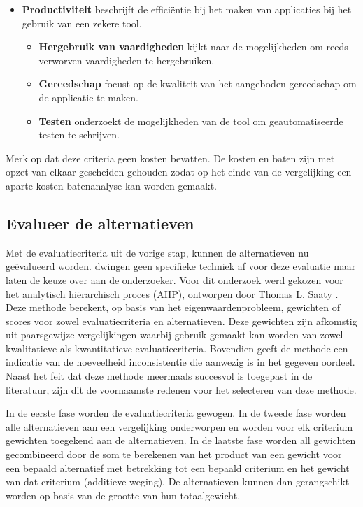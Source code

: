 \documentclass[a4paper]{IEEEconf}
\begin{document}
\begin{itemize}
    \item \textbf{Productiviteit} beschrijft de effici\"entie bij het maken van applicaties bij het gebruik van een zekere tool. 
    \begin{itemize}
        \item \textbf{Hergebruik van vaardigheden} kijkt naar de mogelijkheden om reeds verworven vaardigheden te hergebruiken.
        \item \textbf{Gereedschap} focust op de kwaliteit van het aangeboden gereedschap om de applicatie te maken.
        \item \textbf{Testen} onderzoekt de mogelijkheden van de tool om geautomatiseerde testen te schrijven. 
    \end{itemize}
\end{itemize}

Merk op dat deze criteria geen kosten bevatten. De kosten en baten zijn met opzet van elkaar gescheiden gehouden zodat op het einde van de vergelijking een aparte kosten-batenanalyse kan worden gemaakt.

\subsection{Evalueer de alternatieven}

Met de evaluatiecriteria uit de vorige stap, kunnen de alternatieven nu ge\"evalueerd worden. \citet{Jadhav:2011} dwingen geen specifieke techniek af voor deze evaluatie maar laten de keuze over aan de onderzoeker. Voor dit onderzoek werd gekozen voor het analytisch hi\"erarchisch proces (AHP), ontworpen door Thomas L. Saaty \cite{Saaty:1980, Saaty:1990}. Deze methode berekent, op basis van het eigenwaardenprobleem, gewichten of scores voor zowel evaluatiecriteria en alternatieven. Deze gewichten zijn afkomstig uit paarsgewijze vergelijkingen waarbij gebruik gemaakt kan worden van zowel kwalitatieve als kwantitatieve evaluatiecriteria. Bovendien geeft de methode een indicatie van de hoeveelheid inconsistentie die aanwezig is in het gegeven oordeel. Naast het feit dat deze methode meermaals succesvol is toegepast in de literatuur, zijn dit de voornaamste redenen voor het selecteren van deze methode. 

In de eerste fase worden de evaluatiecriteria gewogen. In de tweede fase worden alle alternatieven aan een vergelijking onderworpen en worden voor elk criterium gewichten toegekend aan de alternatieven. In de laatste fase worden all gewichten gecombineerd door de som te berekenen van het product van een gewicht voor een bepaald alternatief met betrekking tot een bepaald criterium en het gewicht van dat criterium (additieve weging). De alternatieven kunnen dan gerangschikt worden op basis van de grootte van hun totaalgewicht.
\end{document}
